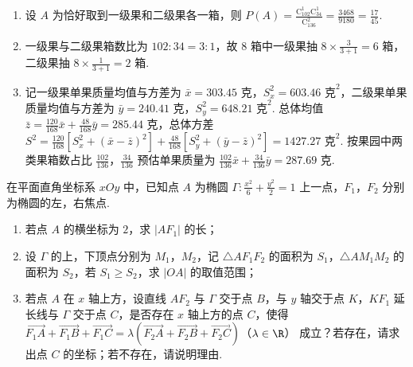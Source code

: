\begin{solution}
\begin{enumerate}
\item 设 \(A\) 为恰好取到一级果和二级果各一箱，则 \(P(A)=\frac{\mathrm C_{102}^1\mathrm C_{34}^1}{\mathrm C_{136}^2}=\frac{3468}{9180}=\frac{17}{45}\).
\item 一级果与二级果箱数比为 \(102:34=3:1\)，故 \(8\) 箱中一级果抽 \(8\times\frac{3}{3+1}=6\) 箱，二级果抽 \(8\times\frac{1}{3+1}=2\) 箱.
\item 记一级果单果质量均值与方差为 \(\bar x=303.45\text{ 克}\)，\(S_x^2=603.46\text{ 克}^2\)，二级果单果质量均值与方差为 \(\bar y=240.41\text{ 克}\)，\(S_y^2=648.21\text{ 克}^2\). 总体均值 \(\bar z=\frac{120}{168}\bar x+\frac{48}{168}\bar y=285.44\text{ 克}\)，总体方差 \(S^2=\frac{120}{168}\left[S_x^2+(\bar x-\bar z)^2\right]+\frac{48}{168}\left[S_y^2+(\bar y-\bar z)^2\right]=1427.27\text{ 克}^2\). 按果园中两类果箱数占比 \(\frac{102}{136}\)，\(\frac{34}{136}\) 预估单果质量为 \(\frac{102}{136}\bar x+\frac{34}{136}\bar y=287.69\text{ 克}\).
\end{enumerate}
\end{solution}

\begin{problem}
在平面直角坐标系 \(xOy\) 中，已知点 \(A\) 为椭圆 \(\Gamma:\frac{x^2}{6}+\frac{y^2}{2}=1\) 上一点，\(F_1\)，\(F_2\) 分别为椭圆的左，右焦点.

\begin{enumerate}
\item 若点 \(A\) 的横坐标为 \(2\)，求 \(\left|AF_1\right|\) 的长；
\item 设 \(\Gamma\) 的上，下顶点分别为 \(M_1\)，\(M_2\)，记 \(\triangle AF_1F_2\) 的面积为 \(S_1\)，\(\triangle AM_1M_2\) 的面积为 \(S_2\)，若 \(S_1\ge S_2\)，求 \(\left|OA\right|\) 的取值范围；
\item 若点 \(A\) 在 \(x\) 轴上方，设直线 \(AF_2\) 与 \(\Gamma\) 交于点 \(B\)，与 \(y\) 轴交于点 \(K\)，\(KF_1\) 延长线与 \(\Gamma\) 交于点 \(C\)，是否存在 \(x\) 轴上方的点 \(C\)，使得 \(\overrightarrow{F_1A}+\overrightarrow{F_1B}+\overrightarrow{F_1C} =\lambda\left(\overrightarrow{F_2A}+\overrightarrow{F_2B}+\overrightarrow{F_2C}\right)\)（\(\lambda\in\R\)）
成立？若存在，请求出点 \(C\) 的坐标；若不存在，请说明理由.
\end{enumerate}
\end{problem}

